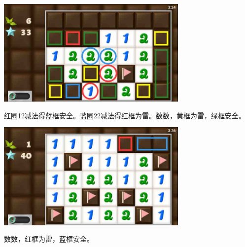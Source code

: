 \begin{center}
    \includegraphics[width=0.7\textwidth]{puzzlelow/232-3.jpg}
\end{center}
红圈12减法得蓝框安全。蓝圈22减法得红框为雷。数数，黄框为雷，绿框安全。
\begin{center}
    \includegraphics[width=0.7\textwidth]{puzzlelow/232-4.jpg}
\end{center}
数数，红框为雷，蓝框安全。

